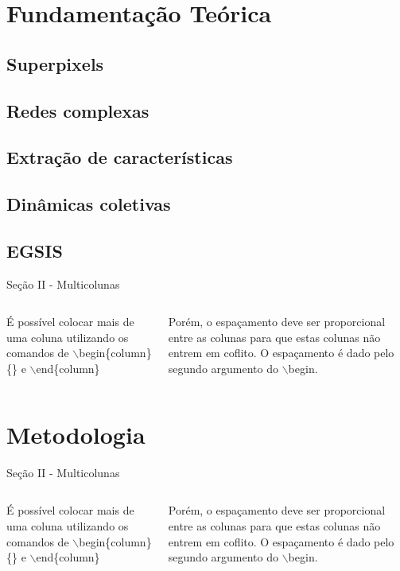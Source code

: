 \documentclass{templatebeamerufc/libs/ufc_format}
\begin{document}
\section{Fundamentação Teórica}
\subsection{Superpixels}
\subsection{Redes complexas}
\subsection{Extração de características}
\subsection{Dinâmicas coletivas}
\subsection{EGSIS}
\begin{frame}{Seção II - Multicolunas}
    \begin{columns}{}
        \begin{column}{0.5\textwidth}
            \justify
            É possível colocar mais de uma coluna utilizando os comandos de $\backslash$begin\{column\}\{\} e $\backslash$end\{column\}
        \end{column}
        \begin{column}{0.5\textwidth}
            \justify
            Porém, o espaçamento deve ser proporcional entre as colunas para que estas colunas não entrem em coflito. O espaçamento é dado pelo segundo argumento do $\backslash$begin.
        \end{column}
    \end{columns}
\end{frame}



\section{Metodologia}
\begin{frame}{Seção II - Multicolunas}
    \begin{columns}{}
        \begin{column}{0.5\textwidth}
            \justify
            É possível colocar mais de uma coluna utilizando os comandos de $\backslash$begin\{column\}\{\} e $\backslash$end\{column\}
        \end{column}
        \begin{column}{0.5\textwidth}
            \justify
            Porém, o espaçamento deve ser proporcional entre as colunas para que estas colunas não entrem em coflito. O espaçamento é dado pelo segundo argumento do $\backslash$begin.
        \end{column}
    \end{columns}
\end{frame}
\end{document}
